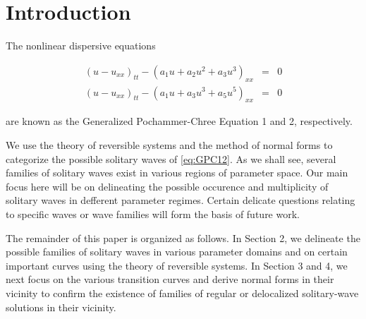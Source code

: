 \section{Introduction}

The nonlinear dispersive equations \cite{Roy1}

\begin{subequations}\label{eq:GPC}
\begin{eqnarray}
\left( u - u_{xx} \right)_{tt} - \left( a_1 u + a_2 u^2 + a_3 u^3 \right)_{xx} &=&0 \label{eq:GPC1} \\
\left( u - u_{xx} \right)_{tt} - \left( a_1 u + a_3 u^3 + a_5 u^5 \right)_{xx} &=&0 \label{eq:GPC2} 
\end{eqnarray}
\end{subequations}

are known as the Generalized Pochammer-Chree Equation 1 and 2, respectively.

We use the theory of reversible systems and the method of normal forms to categorize the possible solitary waves of \eqref{eq:GPC12}.
As we shall see, several families of solitary waves exist in various regions of parameter space. Our main focus here will be on 
delineating the possible occurence and multiplicity of solitary waves in defferent parameter regimes. Certain delicate questions
relating to specific waves or wave families will form the basis of future work. 

The remainder of this paper is organized as follows. In Section 2, we delineate the possible families of solitary waves
in various parameter domains and on certain important curves using the theory of reversible systems. In Section 3 and 4, we next
focus on the various transition curves and derive normal forms in their vicinity to confirm the existence of families of 
regular or delocalized solitary-wave solutions in their vicinity.
